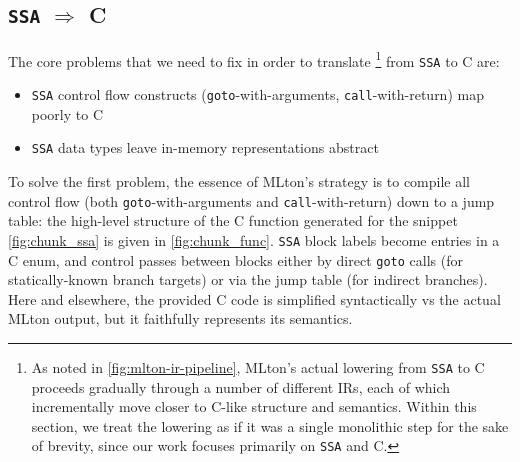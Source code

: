 



\FloatBarrier
\subsection{\texttt{SSA} \texorpdfstring{$\Rightarrow$}{->} C}
The core problems that we need to fix in order to translate
\footnote{As noted in
\cref{fig:mlton-ir-pipeline}, MLton's actual lowering from \texttt{SSA} to C
proceeds gradually through a number of different IRs, each of which
incrementally move closer to C-like structure and semantics. Within this
section, we treat the lowering as if it was a single monolithic step for the
sake of brevity, since our work focuses primarily on \texttt{SSA} and C.}
from \texttt{SSA} to C are:
\begin{itemize}
\item \texttt{SSA} control flow constructs (\texttt{goto}-with-arguments,
  \texttt{call}-with-return) map poorly to C
\item \texttt{SSA} data types leave in-memory representations abstract
\end{itemize}


To solve the first problem, the essence of MLton's strategy is to compile all
control flow (both \texttt{goto}-with-arguments and \texttt{call}-with-return)
down to a jump table: the high-level structure of the C function generated for
the snippet \cref{fig:chunk_ssa} is given in \cref{fig:chunk_func}. \texttt{SSA}
block labels become entries in a C enum, and control passes between blocks
either by direct \texttt{goto} calls (for statically-known branch targets) or
via the jump table (for indirect branches). Here and elsewhere, the provided C
code is simplified syntactically vs the actual MLton output, but it faithfully
represents its semantics.

